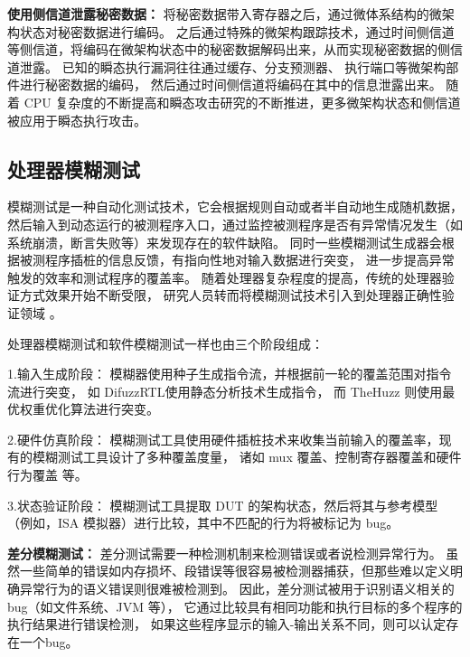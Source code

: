 \textbf{使用侧信道泄露秘密数据：}
将秘密数据带入寄存器之后，通过微体系结构的微架构状态对秘密数据进行编码。
之后通过特殊的微架构跟踪技术，通过时间侧信道等侧信道，将编码在微架构状态中的秘密数据解码出来，从而实现秘密数据的侧信道泄露。
已知的瞬态执行漏洞往往通过缓存\cite{yarom2014flush+}、分支预测器\cite{evtyushkin2018branchscope}、
执行端口\cite{bhattacharyya2019smotherspectre}等微架构部件进行秘密数据的编码，
然后通过时间侧信道将编码在其中的信息泄露出来。
随着 CPU 复杂度的不断提高和瞬态攻击研究的不断推进，更多微架构状态和侧信道被应用于瞬态执行攻击。\par

\subsection{处理器模糊测试}

模糊测试是一种自动化测试技术，它会根据规则自动或者半自动地生成随机数据，
然后输入到动态运行的被测程序入口，通过监控被测程序是否有异常情况发生（如系统崩溃，断言失败等）来发现存在的软件缺陷。
同时一些模糊测试生成器会根据被测程序插桩的信息反馈，有指向性地对输入数据进行突变，
进一步提高异常触发的效率和测试程序的覆盖率。
随着处理器复杂程度的提高，传统的处理器验证方式效果开始不断受限，
研究人员转而将模糊测试技术引入到处理器正确性验证领域 
\cite{bruns2022efficient}\cite{canakci2021directfuzz}\cite{hur2021difuzzrtl}。\par

处理器模糊测试和软件模糊测试一样也由三个阶段组成：\par

1.输入生成阶段：
模糊器使用种子生成指令流，并根据前一轮的覆盖范围对指令流进行突变，
如 DifuzzRTL\cite{hur2021difuzzrtl}使用静态分析技术生成指令，
而 TheHuzz\cite{kande2022thehuzz} 则使用最优权重优化算法进行突变。\par

2.硬件仿真阶段：
模糊测试工具使用硬件插桩技术来收集当前输入的覆盖率，现有的模糊测试工具设计了多种覆盖度量，
诸如 mux 覆盖\cite{laeufer2018rfuzz}、控制寄存器覆盖\cite{hur2021difuzzrtl}和硬件行为覆盖\cite{kande2022thehuzz} 等。\par

3.状态验证阶段：
模糊测试工具提取 DUT 的架构状态，然后将其与参考模型（例如，ISA 模拟器）进行比较，其中不匹配的行为将被标记为 bug。\par

\par

\textbf{差分模糊测试：}
差分测试需要一种检测机制来检测错误或者说检测异常行为。
虽然一些简单的错误如内存损坏、段错误等很容易被检测器捕获，但那些难以定义明确异常行为的语义错误则很难被检测到。
因此，差分测试被用于识别语义相关的 bug（如文件系统\cite{min2015cross}、JVM\cite{chen2019deep} 等），
它通过比较具有相同功能和执行目标的多个程序的执行结果进行错误检测，
如果这些程序显示的输入-输出关系不同，则可以认定存在一个bug。\par

